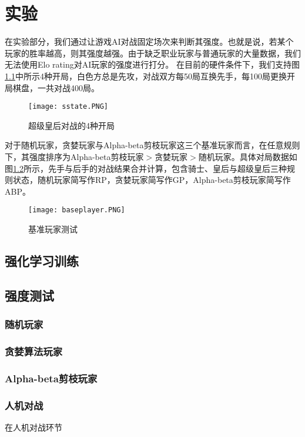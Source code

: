 \chapter{实验}
\label{chap:experiment}
在实验部分，我们通过让游戏AI对战固定场次来判断其强度。也就是说，若某个玩家的胜率越高，则其强度越强。由于缺乏职业玩家与普通玩家的大量数据，我们无法使用Elo rating对AI玩家的强度进行打分\cite{glickman1999rating}。
在目前的硬件条件下，我们支持图\ref{fig:sstate}中所示4种开局，白色方总是先攻，对战双方每50局互换先手，每100局更换开局棋盘，一共对战400局。
\begin{figure}[H]
    \centering
    \texttt{[image: sstate.PNG]}
    \caption[sstate]{%
        超级皇后对战的4种开局%
      }
    \label{fig:sstate}
\end{figure}
对于随机玩家，贪婪玩家与Alpha-beta剪枝玩家这三个基准玩家而言，在任意规则下，其强度排序为Alpha-beta剪枝玩家$>$贪婪玩家$>$随机玩家。具体对局数据如图\ref{fig:baseresult}所示，先手与后手的对战结果合并计算，包含骑士、皇后与超级皇后三种规则状态，随机玩家简写作RP，贪婪玩家简写作GP，Alpha-beta剪枝玩家简写作ABP。
\begin{figure}[H]
    \centering
    \texttt{[image: baseplayer.PNG]}
    \caption[baseresult]{%
        基准玩家测试%
      }
    \label{fig:baseresult}
\end{figure}
\section{强化学习训练}

\section{强度测试}

\subsection{随机玩家}

\subsection{贪婪算法玩家}

\subsection{Alpha-beta剪枝玩家}

\subsection{人机对战}
在人机对战环节

